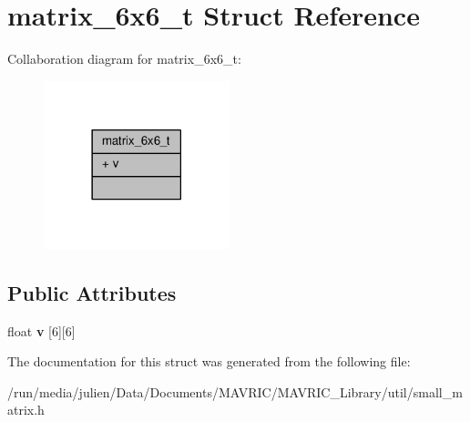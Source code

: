 \hypertarget{structmatrix__6x6__t}{\section{matrix\+\_\+6x6\+\_\+t Struct Reference}
\label{structmatrix__6x6__t}
}


Collaboration diagram for matrix\+\_\+6x6\+\_\+t\+:
\nopagebreak
\begin{figure}[H]
\begin{center}
\leavevmode
\includegraphics[width=153pt]{structmatrix__6x6__t__coll__graph}
\end{center}
\end{figure}
\subsection*{Public Attributes}
\begin{DoxyCompactItemize}
\item 
\hypertarget{structmatrix__6x6__t_a4a1a1a844e7fa745af698618410b1c18}{float {\bfseries v} \mbox{[}6\mbox{]}\mbox{[}6\mbox{]}}\label{structmatrix__6x6__t_a4a1a1a844e7fa745af698618410b1c18}

\end{DoxyCompactItemize}


The documentation for this struct was generated from the following file\+:\begin{DoxyCompactItemize}
\item 
/run/media/julien/\+Data/\+Documents/\+M\+A\+V\+R\+I\+C/\+M\+A\+V\+R\+I\+C\+\_\+\+Library/util/small\+\_\+matrix.\+h\end{DoxyCompactItemize}
